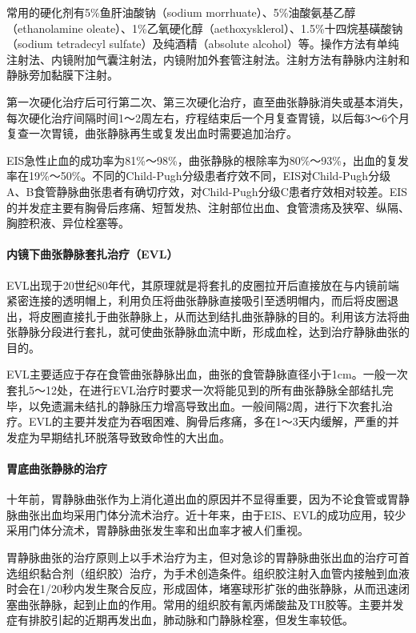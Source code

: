 常用的硬化剂有5\%鱼肝油酸钠（sodium
morrhuate）、5\%油酸氨基乙醇（ethanolamine
oleate）、1\%乙氧硬化醇（aethoxysklerol）、1.5\%十四烷基磺酸钠（sodium
tetradecyl sulfate）及纯酒精（absolute
alcohol）等。操作方法有单纯注射法、内镜附加气囊注射法，内镜附加外套管注射法。注射方法有静脉内注射和静脉旁加黏膜下注射。

第一次硬化治疗后可行第二次、第三次硬化治疗，直至曲张静脉消失或基本消失，每次硬化治疗间隔时间1～2周左右，疗程结束后一个月复查胃镜，以后每3～6个月复查一次胃镜，曲张静脉再生或复发出血时需要追加治疗。

EIS急性止血的成功率为81\%～98\%，曲张静脉的根除率为80\%～93\%，出血的复发率在19\%～50\%。不同的Child-Pugh分级患者疗效不同，EIS对Child-Pugh分级A、B食管静脉曲张患者有确切疗效，对Child-Pugh分级C患者疗效相对较差。EIS的并发症主要有胸骨后疼痛、短暂发热、注射部位出血、食管溃疡及狭窄、纵隔、胸腔积液、异位栓塞等。

\paragraph{内镜下曲张静脉套扎治疗（EVL）}

EVL出现于20世纪80年代，其原理就是将套扎的皮圈拉开后直接放在与内镜前端紧密连接的透明帽上，利用负压将曲张静脉直接吸引至透明帽内，而后将皮圈退出，将皮圈直接扎于曲张静脉上，从而达到结扎曲张静脉的目的。利用该方法将曲张静脉分段进行套扎，就可使曲张静脉血流中断，形成血栓，达到治疗静脉曲张的目的。

EVL主要适应于存在食管曲张静脉出血，曲张的食管静脉直径小于1cm。一般一次套扎5～12处，在进行EVL治疗时要求一次将能见到的所有曲张静脉全部结扎完毕，以免遗漏未结扎的静脉压力增高导致出血。一般间隔2周，进行下次套扎治疗。EVL的主要并发症为吞咽困难、胸骨后疼痛，多在1～3天内缓解，严重的并发症为早期结扎环脱落导致致命性的大出血。

\paragraph{胃底曲张静脉的治疗}

十年前，胃静脉曲张作为上消化道出血的原因并不显得重要，因为不论食管或胃静脉曲张出血均采用门体分流术治疗。近十年来，由于EIS、EVL的成功应用，较少采用门体分流术，胃静脉曲张发生率和出血率才被人们重视。

胃静脉曲张的治疗原则上以手术治疗为主，但对急诊的胃静脉曲张出血的治疗可首选组织黏合剂（组织胶）治疗，为手术创造条件。组织胶注射入血管内接触到血液时会在1/20秒内发生聚合反应，形成固体，堵塞球形扩张的曲张静脉，从而迅速闭塞曲张静脉，起到止血的作用。常用的组织胶有氰丙烯酸盐及TH胶等。主要并发症有排胶引起的近期再发出血，肺动脉和门静脉栓塞，但发生率较低。

